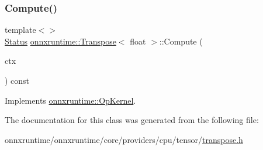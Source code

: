 \subsubsection{\texorpdfstring{Compute()}{Compute()}\hspace{0.1cm}{\footnotesize\ttfamily [2/2]}}
{\footnotesize\ttfamily template$<$$>$ \\
\mbox{\hyperlink{classonnxruntime_1_1common_1_1Status}{Status}} \mbox{\hyperlink{classonnxruntime_1_1Transpose}{onnxruntime\+::\+Transpose}}$<$ float $>$\+::Compute (\begin{DoxyParamCaption}\item[{\mbox{\hyperlink{classonnxruntime_1_1OpKernelContext}{Op\+Kernel\+Context}} $\ast$}]{ctx }\end{DoxyParamCaption}) const\hspace{0.3cm}{\ttfamily [virtual]}}



Implements \mbox{\hyperlink{classonnxruntime_1_1OpKernel_a9eca8656a78b1b3ab9d3351a12798650}{onnxruntime\+::\+Op\+Kernel}}.



The documentation for this class was generated from the following file\+:\begin{DoxyCompactItemize}
\item 
onnxruntime/onnxruntime/core/providers/cpu/tensor/\mbox{\hyperlink{cpu_2tensor_2transpose_8h}{transpose.\+h}}\end{DoxyCompactItemize}
